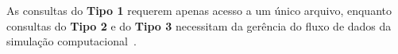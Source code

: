 As consultas do \textbf{Tipo 1} requerem apenas acesso a um único arquivo, enquanto consultas do \textbf{Tipo 2} e do \textbf{Tipo 3} necessitam da gerência do fluxo de dados da simulação computacional~\cite{silva2015analyzing}.





